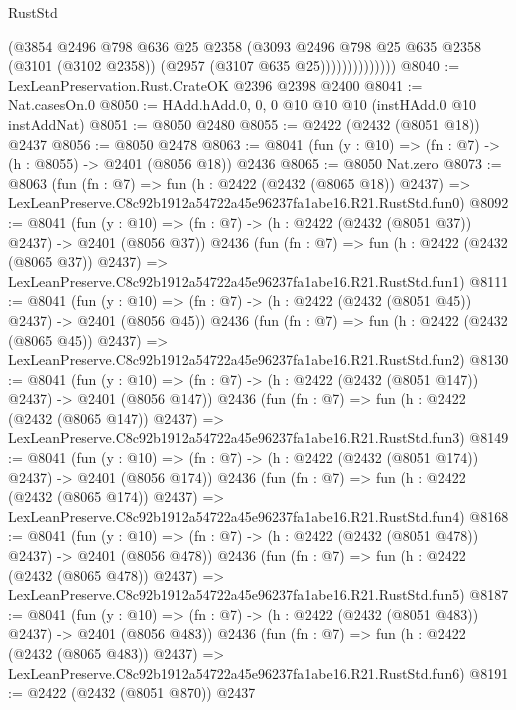 \begin{lexlean}{RustStd}
\begin{coremodule}
                        (@3854
                          @2496
                          @798
                          @636
                          @25
                          @2358
                          (@3093
                            @2496
                            @798
                            @25
                            @635
                            @2358
                            (@3101 (@3102 @2358))
                            (@2957 (@3107 @635 @25))))))))))))))
@8040 := LexLeanPreservation.Rust.CrateOK @2396 @2398 @2400
@8041 := Nat.casesOn.{0}
@8050 := HAdd.hAdd.{0, 0, 0} @10 @10 @10 (instHAdd.{0} @10 instAddNat)
@8051 := @8050 @2480
@8055 := @2422 (@2432 (@8051 @18)) @2437
@8056 := @8050 @2478
@8063 := @8041 (fun (y : @10) => (fn : @7) -> (h : @8055) -> @2401 (@8056 @18)) @2436
@8065 := @8050 Nat.zero
@8073 := @8063
    (fun (fn : @7) =>
    fun (h : @2422 (@2432 (@8065 @18)) @2437) =>
    LexLeanPreserve.C8c92b1912a54722a45e96237fa1abe16.R21.RustStd.fun0)
@8092 := @8041
    (fun (y : @10) => (fn : @7) -> (h : @2422 (@2432 (@8051 @37)) @2437) -> @2401 (@8056 @37))
    @2436
    (fun (fn : @7) =>
    fun (h : @2422 (@2432 (@8065 @37)) @2437) =>
    LexLeanPreserve.C8c92b1912a54722a45e96237fa1abe16.R21.RustStd.fun1)
@8111 := @8041
    (fun (y : @10) => (fn : @7) -> (h : @2422 (@2432 (@8051 @45)) @2437) -> @2401 (@8056 @45))
    @2436
    (fun (fn : @7) =>
    fun (h : @2422 (@2432 (@8065 @45)) @2437) =>
    LexLeanPreserve.C8c92b1912a54722a45e96237fa1abe16.R21.RustStd.fun2)
@8130 := @8041
    (fun (y : @10) => (fn : @7) -> (h : @2422 (@2432 (@8051 @147)) @2437) -> @2401 (@8056 @147))
    @2436
    (fun (fn : @7) =>
    fun (h : @2422 (@2432 (@8065 @147)) @2437) =>
    LexLeanPreserve.C8c92b1912a54722a45e96237fa1abe16.R21.RustStd.fun3)
@8149 := @8041
    (fun (y : @10) => (fn : @7) -> (h : @2422 (@2432 (@8051 @174)) @2437) -> @2401 (@8056 @174))
    @2436
    (fun (fn : @7) =>
    fun (h : @2422 (@2432 (@8065 @174)) @2437) =>
    LexLeanPreserve.C8c92b1912a54722a45e96237fa1abe16.R21.RustStd.fun4)
@8168 := @8041
    (fun (y : @10) => (fn : @7) -> (h : @2422 (@2432 (@8051 @478)) @2437) -> @2401 (@8056 @478))
    @2436
    (fun (fn : @7) =>
    fun (h : @2422 (@2432 (@8065 @478)) @2437) =>
    LexLeanPreserve.C8c92b1912a54722a45e96237fa1abe16.R21.RustStd.fun5)
@8187 := @8041
    (fun (y : @10) => (fn : @7) -> (h : @2422 (@2432 (@8051 @483)) @2437) -> @2401 (@8056 @483))
    @2436
    (fun (fn : @7) =>
    fun (h : @2422 (@2432 (@8065 @483)) @2437) =>
    LexLeanPreserve.C8c92b1912a54722a45e96237fa1abe16.R21.RustStd.fun6)
@8191 := @2422 (@2432 (@8051 @870)) @2437

\end{coremodule}
\end{lexlean}
